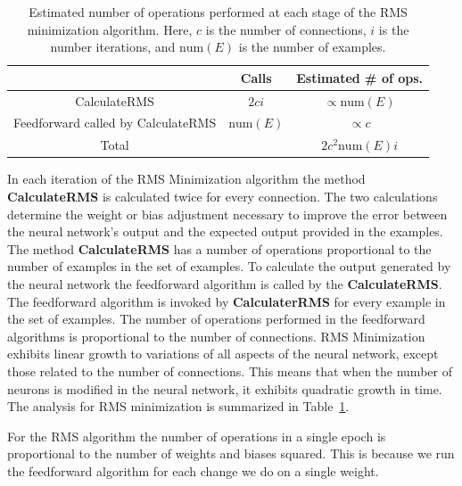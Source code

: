 \documentclass[11pt]{article}
\begin{document}
\begin{table}
	\label{tab:RMSminimization}
	\begin{center}
		\begin{tabular}{ccc}
		\hline
		 & Calls & Estimated \# of ops.\\
		\hline
		CalculateRMS & $2ci$ & $\propto \mbox{num}(E)$\\
		Feedforward called by CalculateRMS & $\mbox{num}(E)$ & $\propto c$\\
		\hline
		Total &  & $2c^2\mbox{num}(E)i$\\
		\hline
		\end{tabular}	
	\end{center}
	\caption{Estimated number of operations performed at each stage of the RMS minimization algorithm. Here, $c$ is the number of connections, $i$ is the number iterations, and $\mbox{num}(E)$ is the number of examples.}
\end{table}

In each iteration of the RMS Minimization algorithm the method \textbf{CalculateRMS} is calculated twice for every connection. The two
calculations determine the weight or bias adjustment necessary to improve the error between the neural network's output and the expected
output provided in the examples. The method \textbf{CalculateRMS} has a number of operations proportional to the number of examples in
the set of examples. To calculate the output generated by the neural network the feedforward algorithm is called by the
\textbf{CalculateRMS}. The feedforward algorithm is invoked by \textbf{CalculaterRMS} for every example in the set of examples. The
number of operations performed in the feedforward algorithms is proportional to the number of connections. RMS Minimization exhibits
linear growth to variations of all aspects of the neural network, except those related to the number of connections. This means that
when the number of neurons is modified in the neural network, it exhibits quadratic growth in time. The analysis for RMS minimization is
summarized in Table~\ref{tab:RMSminimization}.

For the RMS algorithm the number of operations in a single epoch is proportional to the number of weights and biases squared. This is
because we run the feedforward algorithm for each change we do on a single weight.
\end{document}
